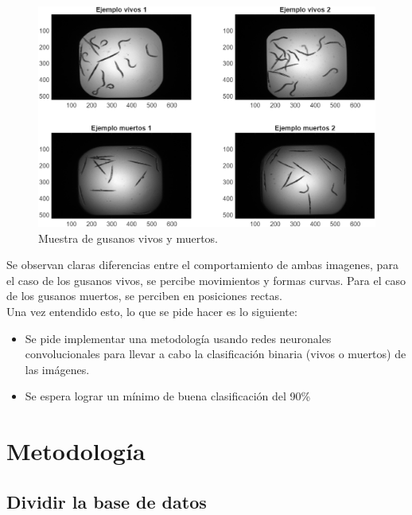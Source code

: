 \documentclass[11pt, letterpaper]{article}
\begin{document}
\begin{figure}[h!]
	\centering
	\begin{minipage}{0.8\textwidth}
		\centering
		\includegraphics[width=\textwidth]{IMG/R1.png}
		\caption*{Muestra de gusanos vivos y muertos.}
	\end{minipage}\hfill
\end{figure}

Se observan claras diferencias entre el comportamiento de ambas imagenes, para el caso de los gusanos vivos, se percibe movimientos y formas curvas. Para el caso de los gusanos muertos, se perciben en posiciones rectas. \\

Una vez entendido esto, lo que se pide hacer es lo siguiente:


\begin{itemize}
	\item Se pide implementar una metodología usando redes neuronales convolucionales para llevar a cabo la clasificación binaria (vivos o muertos) de las imágenes.
	
	\item Se espera lograr un mínimo de buena clasificación del 90\%
	
\end{itemize}




	
\newpage
	
\section{Metodología}

\subsection{Dividir la base de datos}
\end{document}
